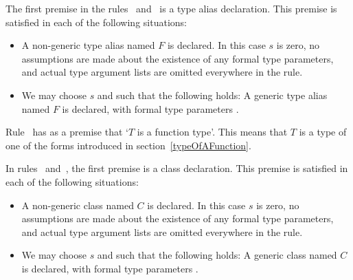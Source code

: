 \documentclass[makeidx]{article}
\begin{document}
{

\LMHash{}%
The first premise in the
rules~\SrnLeftTypeAlias{} and~\SrnRightTypeAlias{}
is a type alias declaration.
This premise is satisfied in each of the following situations:

\begin{itemize}
\item A non-generic type alias named $F$ is declared.
  In this case $s$ is zero,
  no assumptions are made about the existence
  of any formal type parameters,
  and actual type argument lists are omitted everywhere in the rule.
\item We may choose $s$ and  such that the following holds:
  A generic type alias named $F$ is declared,
  with formal type parameters .
\end{itemize}

\LMHash{}%
Rule~\SrnRightFunction{} has as a premise that `$T$ is a function type'.
This means that $T$ is a type of one of the forms introduced in
section~\ref{typeOfAFunction}.

\LMHash{}%
In rules~\SrnCovariance{} and~\SrnSuperinterface,
the first premise is a class declaration.
This premise is satisfied in each of the following situations:

\begin{itemize}
\item A non-generic class named $C$ is declared.
  In this case $s$ is zero,
  no assumptions are made about the existence
  of any formal type parameters,
  and actual type argument lists are omitted everywhere in the rule.
\item We may choose $s$ and  such that the following holds:
  A generic class named $C$ is declared,
  with formal type parameters .
\end{itemize}

}
\end{document}
